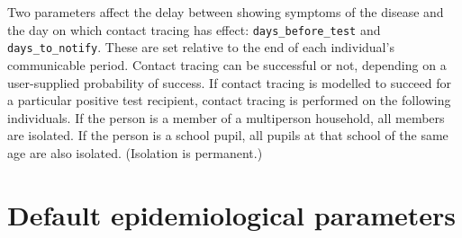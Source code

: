 \documentclass[submission]{grattan}
\newcommand*{\code}[1]{\texttt{#1}}
\begin{document}
Two parameters affect the delay between showing symptoms of the 
disease and the day on which contact tracing has effect: 
\code{days\_before\_test} and \code{days\_to\_notify}. These are set
relative to the end of each individual's communicable period. Contact 
tracing can be successful or not, depending on a user-supplied probability
of success. If contact tracing is modelled to succeed for a particular 
positive test recipient,
contact tracing is performed on the following individuals. 
If the person is a member of a multiperson
household, all members are isolated. If the person is a school pupil, all
pupils at that school of the same age are also isolated. (Isolation is permanent.)


\onecolumn
\section{Default epidemiological parameters}
\end{document}
